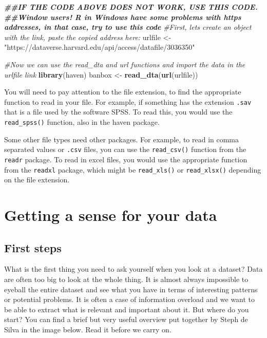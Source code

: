 \documentclass[
]{book}
\newenvironment{Shaded}{\begin{snugshade}}{\end{snugshade}}
\newcommand{\CommentTok}[1]{\textcolor[rgb]{0.56,0.35,0.01}{\textit{#1}}}
\newcommand{\DocumentationTok}[1]{\textcolor[rgb]{0.56,0.35,0.01}{\textbf{\textit{#1}}}}
\newcommand{\FunctionTok}[1]{\textcolor[rgb]{0.13,0.29,0.53}{\textbf{#1}}}
\newcommand{\NormalTok}[1]{#1}
\newcommand{\OtherTok}[1]{\textcolor[rgb]{0.56,0.35,0.01}{#1}}
\newcommand{\StringTok}[1]{\textcolor[rgb]{0.31,0.60,0.02}{#1}}
\begin{document}
\begin{Shaded}
\begin{Highlighting}[]
\DocumentationTok{\#\#IF THE CODE ABOVE DOES NOT WORK, USE THIS CODE.}
\DocumentationTok{\#\#Window users! R in Windows have some problems with https addresses, in that case, try to use this code}
\CommentTok{\#First, let\textquotesingle{}s create an object with the link, paste the copied address here:}
\NormalTok{urlfile }\OtherTok{\textless{}{-}} \StringTok{"https://dataverse.harvard.edu/api/access/datafile/3036350"}

\CommentTok{\#Now we can use the \textquotesingle{}read\_dta\textquotesingle{} and \textquotesingle{}url\textquotesingle{} functions and import the data in the urlfile link}
\FunctionTok{library}\NormalTok{(haven)}
\NormalTok{banbox }\OtherTok{\textless{}{-}} \FunctionTok{read\_dta}\NormalTok{(}\FunctionTok{url}\NormalTok{(urlfile))}
\end{Highlighting}
\end{Shaded}

You will need to pay attention to the file extension, to find the appropriate function to read in your file. For example, if something has the extension \texttt{.sav} that is a file used by the software SPSS. To read this, you would use the \texttt{read\_spss()} function, also in the haven package.

Some other file types need other packages. For example, to read in comma separated values or \texttt{.csv} files, you can use the \texttt{read\_csv()} function from the \texttt{readr} package. To read in excel files, you would use the appropriate function from the \texttt{readxl} package, which might be \texttt{read\_xls()} or \texttt{read\_xlsx()} depending on the file extension.

\section{Getting a sense for your data}\label{getting-a-sense-for-your-data}

\subsection{First steps}\label{first-steps}

What is the first thing you need to ask yourself when you look at a dataset? Data are often too big to look at the whole thing. It is almost always impossible to eyeball the entire dataset and see what you have in terms of interesting patterns or potential problems. It is often a case of information overload and we want to be able to extract what is relevant and important about it. But where do you start? You can find a brief but very useful overview put together by Steph de Silva in the image below. Read it before we carry on.
\end{document}
